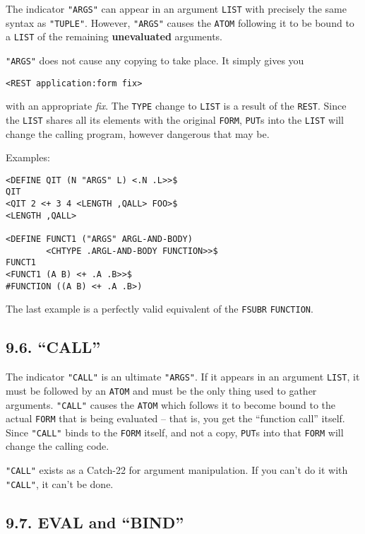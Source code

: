 \documentclass[a4paper,]{article}
\begin{document}
The indicator \texttt{"ARGS"}  can appear in an argument \texttt{LIST} with precisely the
same syntax as \texttt{"TUPLE"}. However, \texttt{"ARGS"} causes the \texttt{ATOM} following it to be bound to a
\texttt{LIST} of the remaining \textbf{unevaluated} arguments.

\texttt{"ARGS"} does not cause any copying to take place. It simply gives you

\begin{verbatim}
<REST application:form fix>
\end{verbatim}

with an appropriate \emph{fix}. The \texttt{TYPE} change to \texttt{LIST} is a result of the \texttt{REST}. Since the
\texttt{LIST} shares all its elements with the original \texttt{FORM}, \texttt{PUT}s into the \texttt{LIST} will change the
calling program, however dangerous that may be.

Examples:

\begin{verbatim}
<DEFINE QIT (N "ARGS" L) <.N .L>>$
QIT
<QIT 2 <+ 3 4 <LENGTH ,QALL> FOO>$
<LENGTH ,QALL>

<DEFINE FUNCT1 ("ARGS" ARGL-AND-BODY)
        <CHTYPE .ARGL-AND-BODY FUNCTION>>$
FUNCT1
<FUNCT1 (A B) <+ .A .B>>$
#FUNCTION ((A B) <+ .A .B>)
\end{verbatim}

The last example is a perfectly valid equivalent of the \texttt{FSUBR} \texttt{FUNCTION}.

\subsection{\texorpdfstring{9.6. ``CALL''}{9.6. CALL}}\label{call}

The indicator \texttt{"CALL"}  is an ultimate \texttt{"ARGS"}. If it appears in an argument
\texttt{LIST}, it must be followed by an \texttt{ATOM} and must be the only thing used to gather arguments. \texttt{"CALL"}
causes the \texttt{ATOM} which follows it to become bound to the actual \texttt{FORM} that is being evaluated -- that is,
you get the ``function call'' itself. Since \texttt{"CALL"} binds to the \texttt{FORM} itself, and not a copy,
\texttt{PUT}s into that \texttt{FORM} will change the calling code.

\texttt{"CALL"} exists as a Catch-22 for argument manipulation. If you can't do it with \texttt{"CALL"}, it can't be done.

\subsection{\texorpdfstring{9.7. EVAL and ``BIND''}{9.7. EVAL and BIND}}\label{eval-and-bind}
\end{document}
